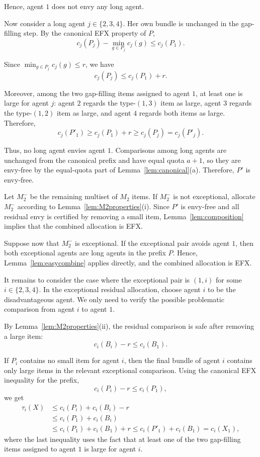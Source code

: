 \documentclass{article}
\theoremstyle{definition}
\begin{document}
Hence, agent $1$ does not envy any long agent.

Now consider a long agent $j\in\{2,3,4\}$.  Her own bundle is unchanged in
the gap-filling step.  By the canonical EFX property of $P$,
\[
    c_j(P_j)-\min_{g\in P_j}c_j(g)\le c_j(P_1).
\]

Since $\min_{g\in P_j}c_j(g)\le r$, we have
\[
    c_j(P_j)\le c_j(P_1)+r.
\]

Moreover, among the two gap-filling items assigned to agent $1$, at least one
is large for agent $j$: agent $2$ regards the type-$(1,3)$ item as large,
agent $3$ regards the type-$(1,2)$ item as large, and agent $4$ regards both
items as large.  Therefore,
\[
    c_j(P'_1)\ge c_j(P_1)+r\ge c_j(P_j)=c_j(P'_j).
\]

Thus, no long agent envies agent $1$.  Comparisons among long agents are
unchanged from the canonical prefix and have equal quota $a+1$, so they are
envy-free by the equal-quota part of Lemma~\ref{lem:canonical}(a).  Therefore,
$P'$ is envy-free.

Let $M_2^-$ be the remaining multiset of $M_2$ items.  If $M_2^-$ is not
exceptional, allocate $M_2^-$ according to Lemma~\ref{lem:M2properties}(i).
Since $P'$ is envy-free and all residual envy is certified by removing a small
item, Lemma~\ref{lem:composition} implies that the combined allocation is EFX.

Suppose now that $M_2^-$ is exceptional.  If the exceptional pair avoids
agent $1$, then both exceptional agents are long agents in the prefix $P$.
Hence, Lemma~\ref{lem:easycombine} applies directly, and the combined allocation
is EFX.

It remains to consider the case where the exceptional pair is $(1,i)$ for
some $i\in\{2,3,4\}$.  In the exceptional residual allocation, choose agent
$i$ to be the disadvantageous agent.  We only need to verify the possible
problematic comparison from agent $i$ to agent $1$.

By Lemma~\ref{lem:M2properties}(ii), the residual comparison is safe after
removing a large item:
\[
    c_i(B_i)-r\le c_i(B_1).
\]

If $P_i$ contains no small item for agent $i$, then the final bundle of agent
$i$ contains only large items in the relevant exceptional comparison.  Using
the canonical EFX inequality for the prefix,
\[
    c_i(P_i)-r\le c_i(P_1),
\]
we get
\[
\begin{aligned}
    \tau_i(X)
    &\le c_i(P_i)+c_i(B_i)-r  \\
    &\le c_i(P_1)+c_i(B_i) \\
    &\le c_i(P_1)+c_i(B_1)+r
    \le c_i(P'_1)+c_i(B_1)=c_i(X_1),
\end{aligned}
\]
where the last inequality uses the fact that at least one of the two
gap-filling items assigned to agent $1$ is large for agent $i$.
\end{document}
